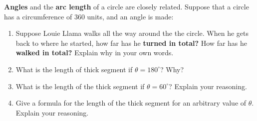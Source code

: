 \documentclass[noauthor,hints,nooutcomes,handout]{ximera}
\begin{document}
\begin{question}
\textbf{Angles} and the \textbf{arc length} of a circle are closely
related. Suppose that a circle has a circumference of $360$ units, and
an angle is made:


\begin{center}
 
\end{center}
\begin{enumerate}
    \item Suppose Louie Llama walks all the way around the the
      circle. When he gets back to where he started, how far has he
      \textbf{turned in total?} How far has he \textbf{walked in
        total?}  Explain why in your own words.
    \item What is the length of thick segment if $\theta=180^\circ$? Why?
    \item What is the length of the thick segment if $\theta=60^\circ$? Explain your reasoning.
    \item Give a formula for the length of the thick segment for an
      arbitrary value of $\theta$. Explain your reasoning.
\end{enumerate}
\end{question}
\mynewpage
\end{document}
